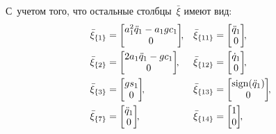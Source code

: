 С~учетом того, что остальные столбцы~$\bar{\xi}$ имеют вид:
\begin{align}
    &\bar{\xi}_{\{1\}} =
    \begin{bmatrix}
        a_1^2 \ddot{q}_1 - a_1 g c_1 \\ 0
    \end{bmatrix}\!\!,
    &
    &\bar{\xi}_{\{11\}} =
    \begin{bmatrix}
        \ddot{q}_1 \\ 0
    \end{bmatrix}\!\!,
    \\
    &\bar{\xi}_{\{2\}} =
    \begin{bmatrix}
        2 a_1 \ddot{q}_1 - g c_1 \\ 0
    \end{bmatrix}\!\!,
    &
    &\bar{\xi}_{\{12\}} =
    \begin{bmatrix}
        \dot{q}_1 \\ 0
    \end{bmatrix}\!\!,
    \\
    &\bar{\xi}_{\{3\}} =
    \begin{bmatrix}
        g s_1 \\ 0
    \end{bmatrix}\!\!,
    &
    &\bar{\xi}_{\{13\}} =
    \begin{bmatrix}
        \sign(\ddot{q}_1) \\ 0
    \end{bmatrix}\!\!,
    \\
    &\bar{\xi}_{\{7\}} =
    \begin{bmatrix}
        \ddot{q}_1 \\ 0
    \end{bmatrix}\!\!,
    &
    &\bar{\xi}_{\{14\}} =
    \begin{bmatrix}
        1 \\ 0
    \end{bmatrix}\!\!,
\end{align}

